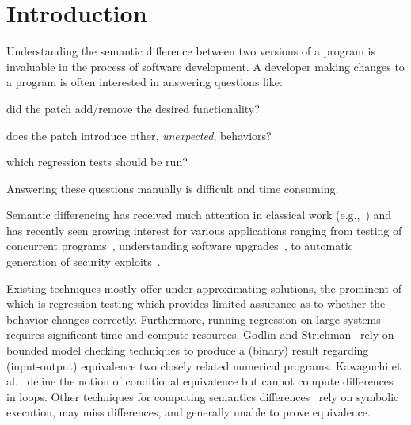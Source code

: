 \section{Introduction} 



Understanding the semantic difference between two versions of a program is invaluable in the process of software development. A developer making changes to a program is often interested in answering questions like: 
\begin{inparaenum}[(i)]
\item did the patch add/remove the desired functionality?
\item does the patch introduce other, \emph{unexpected}, behaviors?
\item which regression tests should be run? 
\end{inparaenum}
Answering these questions manually is difficult and time consuming.

Semantic differencing has received much attention in classical work (e.g.,~\cite{Horwitz90,Horwitz89}) and has recently seen growing interest for various applications ranging from testing of concurrent programs~\cite{ChakiGurfinkelStrichman12}, understanding software upgrades~\cite{JinOrsoXie10}, to automatic generation of security exploits~\cite{BrumleyPoosankamSongZheng08}.

Existing techniques mostly offer under-approximating solutions, the prominent of which is regression testing which provides limited assurance as to whether the behavior changes correctly. Furthermore, running regression on large systems requires significant time and compute resources. Godlin and Strichman~\cite{GodlinStrichman09} rely on bounded model checking techniques to produce a (binary) result regarding (input-output) equivalence two closely related numerical programs. Kawaguchi et al.~\cite{KawaguchiLahiriRebelo10} define the notion of conditional equivalence but cannot compute differences in loops. Other techniques for computing semantics differences~\cite{DwyerElbaumPerson08,EnglerRamos11} rely on
symbolic execution, may miss differences, and generally unable to prove equivalence. 

